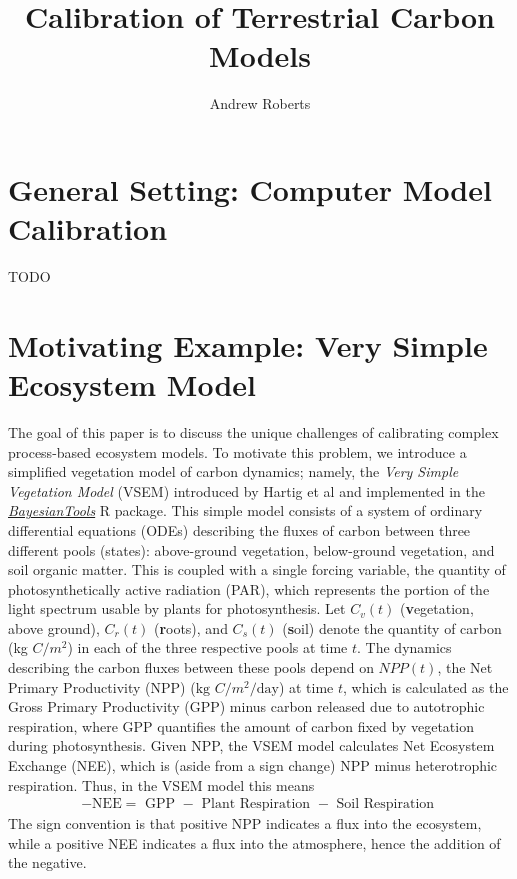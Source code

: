 \documentclass[12pt]{article}
\title{Calibration of Terrestrial Carbon Models}
\author{Andrew Roberts}
\begin{document}
\maketitle
\tableofcontents
\newpage

\section{General Setting: Computer Model Calibration}
TODO

\section{Motivating Example: Very Simple Ecosystem Model}
The goal of this paper is to discuss the unique challenges of calibrating complex process-based ecosystem models. To motivate this problem, we introduce 
a simplified vegetation model of carbon dynamics; namely, the \textit{Very Simple Vegetation Model} (VSEM) introduced by Hartig et al \cite{Hartig} and implemented 
in the \href{https://github.com/florianhartig/BayesianTools}{\textit{BayesianTools}} R package. 
This simple model consists of a system of ordinary differential equations (ODEs) describing the fluxes of carbon between three different pools (states): 
above-ground vegetation, below-ground vegetation, and soil organic matter. This is coupled with a single forcing variable, the quantity of photosynthetically 
active radiation (PAR), which represents the portion of the light spectrum usable by plants for photosynthesis. 
Let $C_v(t)$ (\textbf{v}egetation, above ground), $C_r(t)$ (\textbf{r}oots), and $C_s(t)$ (\textbf{s}oil) denote the quantity of carbon (kg $C/m^2$) in each of the three respective pools at time $t$. 
The dynamics describing the carbon fluxes between these pools depend on $NPP(t)$, the Net Primary Productivity (NPP) ($\text{kg } C/m^2/\text{day}$) at time $t$, 
which is calculated as the Gross Primary Productivity (GPP) minus carbon released due to autotrophic respiration, where GPP quantifies the amount of carbon 
fixed by vegetation during photosynthesis. Given NPP, the VSEM model calculates Net Ecosystem Exchange (NEE), which is (aside from a sign change) 
NPP minus heterotrophic 
respiration. Thus, in the VSEM model this means 
\begin{align}
-\text{NEE} = \text{ GPP } - \text{ Plant Respiration } - \text{ Soil Respiration } 
\end{align}
The sign convention is that positive NPP indicates a flux into the ecosystem, while a positive NEE indicates a flux into the atmosphere, hence the addition of the negative. 
\end{document}
